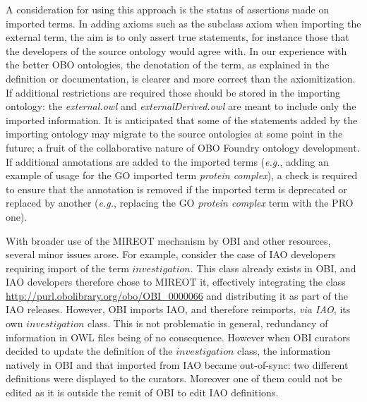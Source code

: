 \documentclass[jou]{ao2e}%
\begin{document}
A consideration for using this approach is the status of assertions made on imported terms.
In adding axioms such as the subclass axiom when importing the external term, the aim is to only assert true statements, for instance those that the developers of the source ontology would agree with. 
In our experience with the better OBO ontologies, the denotation of the term, as explained in the definition or documentation, is clearer and more correct than the axiomitization. %
If additional restrictions are required those should be stored in the importing ontology: the \emph{external.owl} and \emph{externalDerived.owl} are meant to include only the imported information.
It is anticipated that some of the statements added by the importing ontology may migrate to the source ontologies at some point in the future; a fruit of the collaborative nature of OBO Foundry ontology development. %
If additional annotations are added to the imported terms (\emph{e.g.}, adding an example of usage for the \ac{GO} imported term \textit{protein complex}), a check is required to ensure that the annotation is removed if the imported term is deprecated or replaced by another (\emph{e.g.}, replacing  the \ac{GO} \textit{protein complex} term with the \ac{PRO}~\citep{PRO} one).

With broader use of the MIREOT mechanism by OBI and other resources, several minor issues arose.
For example, consider the case of \ac{IAO} developers requiring import of the term $investigation$.  This class already exists in \ac{OBI}, and \ac{IAO} developers therefore chose to MIREOT it, effectively integrating the class \url{http://purl.obolibrary.org/obo/OBI_0000066} and distributing it as part of the \ac{IAO} releases.
However, \ac{OBI} imports \ac{IAO}, and therefore reimports, \emph{via IAO}, its own $investigation$ class. This is not problematic in general, redundancy of information in OWL files being of no consequence. However when \ac{OBI} curators decided to update the definition of the $investigation$ class, the information natively in \ac{OBI} and that imported from \ac{IAO} became out-of-sync: two different definitions were displayed to the curators. Moreover one of them could not be edited as it is outside the remit of OBI to edit IAO definitions.
\end{document}
